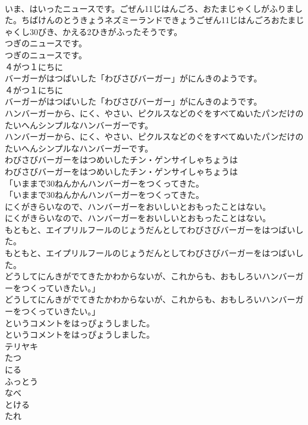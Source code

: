 \documentclass[8pt]{extreport}
\begin{document}
\begin{CJK}{UTF8}{min}
\\	いま、はいったニュースです。ごぜん11じはんごろ、おたまじゃくしがふりました。ちばけんのとうきょうネズミーランドできょうごぜん11じはんごろおたまじゃくし30びき、かえる2ひきがふったそうです。
\\	つぎのニュースです。
\\	つぎのニュースです。
\\	４がつ１にちに
\\	バーガーがはつばいした「わびさびバーガー」がにんきのようです。
\\	４がつ１にちに
\\	バーガーがはつばいした「わびさびバーガー」がにんきのようです。
\\	ハンバーガーから、にく、やさい、ピクルスなどのぐをすべてぬいたパンだけのたいへんシンプルなハンバーガーです。
\\	ハンバーガーから、にく、やさい、ピクルスなどのぐをすべてぬいたパンだけのたいへんシンプルなハンバーガーです。
\\	わびさびバーガーをはつめいしたチン・ゲンサイしゃちょうは
\\	わびさびバーガーをはつめいしたチン・ゲンサイしゃちょうは
\\	「いままで30ねんかんハンバーガーをつくってきた。
\\	「いままで30ねんかんハンバーガーをつくってきた。
\\	にくがきらいなので、ハンバーガーをおいしいとおもったことはない。
\\	にくがきらいなので、ハンバーガーをおいしいとおもったことはない。
\\	もともと、エイプリルフールのじょうだんとしてわびさびバーガーをはつばいした。
\\	もともと、エイプリルフールのじょうだんとしてわびさびバーガーをはつばいした。
\\	どうしてにんきがでてきたかわからないが、これからも、おもしろいハンバーガーをつくっていきたい。」
\\	どうしてにんきがでてきたかわからないが、これからも、おもしろいハンバーガーをつくっていきたい。」
\\	というコメントをはっぴょうしました。
\\	というコメントをはっぴょうしました。
\\	テリヤキ
\\	たつ
\\	にる
\\	ふっとう
\\	なべ
\\	とける
\\	たれ

\end{CJK}
\end{document}
